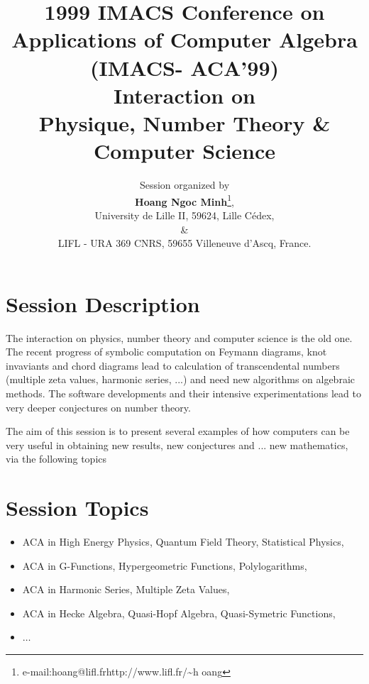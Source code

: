 \documentclass[10pt]{article}
\title{{\small 1999 IMACS Conference on Applications of Computer Algebra (IMACS-
ACA'99)}\\
Interaction on\\
Physique, Number Theory \& Computer Science}
\author{Session organized by\\
{\bf Hoang Ngoc Minh}\thanks{e-mail:hoang@lifl.fr\hfill http://www.lifl.fr/\~{}h
oang},\\
University de Lille II, 59624, Lille C\'edex,\\
\&\\
LIFL - URA 369 CNRS, 59655 Villeneuve d'Ascq, France.}
\date{}
\begin{document}
\maketitle

\section{Session Description}

The interaction on physics, number theory and computer science is the old one.
The recent progress of symbolic computation on Feymann diagrams,
knot invaviants and chord diagrams lead to calculation of transcendental numbers
(multiple zeta values, harmonic series, ...)
and need new algorithms on algebraic methods.
The software developments and their intensive experimentations lead to very
deeper conjectures on number theory.

The aim of this session is to present several examples of how computers can be
very useful in obtaining new results, new conjectures and ... new mathematics,
via the following topics

\section{Session Topics}
\begin{itemize}
\item ACA in High Energy Physics, Quantum Field Theory, Statistical Physics,
\item ACA in G-Functions, Hypergeometric Functions, Polylogarithms,
\item ACA in Harmonic Series, Multiple Zeta Values,
\item ACA in Hecke Algebra, Quasi-Hopf Algebra, Quasi-Symetric Functions,
\item $\ldots$
\end{itemize}
\end{document}
